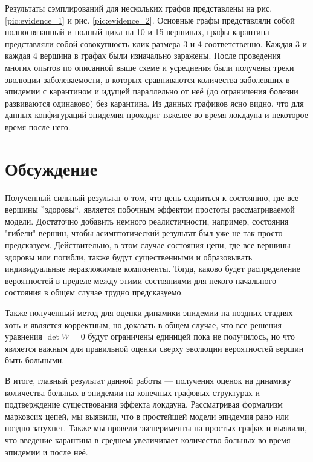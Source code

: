 	Результаты сэмплирований для нескольких графов представлены на рис. \ref{pic:evidence_1} и рис. \ref{pic:evidence_2}. Основные графы представляли собой полносвязанный и полный цикл на 10 и 15 вершинах, графы карантина представляли собой совокупность клик размера 3 и 4 соответственно. Каждая 3 и каждая 4 вершина в графах были изначально заражены. После проведения многих опытов по описанной выше схеме и усреднения были получены треки эволюции заболеваемости, в которых сравниваются количества заболевших в эпидемии с карантином и идущей параллельно от неё (до ограничения болезни развиваются одинаково) без карантина. Из данных графиков ясно видно, что для данных конфигураций эпидемия проходит тяжелее во время локдауна и некоторое время после него.

	\section*{Обсуждение}
	
	Полученный сильный результат о том, что цепь сходиться к состоянию, где все вершины ''здоровы``, является побочным эффектом простоты рассматриваемой модели.  Достаточно добавить немного реалистичности, например, состояния "гибели" вершин, чтобы асимптотический результат был уже не так просто предсказуем. Действительно, в этом случае состояния цепи, где все вершины здоровы или погибли, также будут существенными и образовывать индивидуальные неразложимые компоненты. Тогда, каково будет распределение вероятностей в пределе между этими состояниями для некого начального состояния в общем случае трудно предсказуемо.
	
	Также полученный метод для оценки динамики эпидемии на поздних стадиях хоть и является корректным, но доказать в общем случае, что все решения уравнения $\det W = 0$ будут ограничены единицей пока не получилось, но что является важным для правильной оценки сверху эволюции вероятностей вершин быть больными.
	
	В итоге, главный результат данной работы --- получения оценок на динамику количества больных в эпидемии на конечных графовых структурах и подтверждение существования эффекта локдауна. Рассматривая формализм марковсих цепей, мы выявили, что в простейшей модели эпидемия рано или поздно затухнет. Также мы провели эксперименты на простых графах и выявили, что введение карантина в среднем увеличивает количество больных во время эпидемии и после неё.

	\printbibliography
	
	\newpage
	
